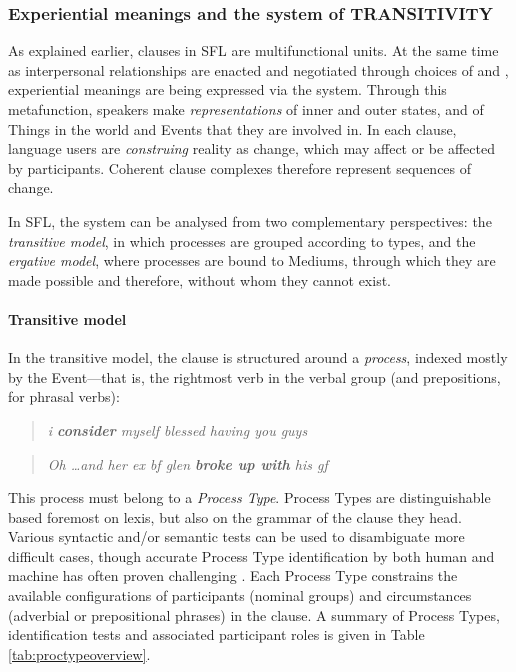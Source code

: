 \subsubsection{Experiential meanings and the system of TRANSITIVITY} \label{sect:trans}

As explained earlier, clauses in \gls{SFL} are multifunctional units. At the same time as interpersonal relationships are enacted and negotiated through choices of  and , experiential meanings are being expressed via the  system. Through this metafunction, speakers make \emph{representations} of inner and outer states, and of Things in the world and Events that they are involved in. In each clause, language users are \emph{construing} reality as change, which may affect or be affected by participants. Coherent clause complexes therefore represent sequences of change.

In \gls{SFL}, the  system can be analysed from two complementary perspectives: the \emph{transitive model}, in which processes are grouped according to types, and the \emph{ergative model}, where processes are bound to Mediums, through which they are made possible and therefore, without whom they cannot exist.

\paragraph{Transitive model}

In the transitive model, the clause is structured around a \emph{process}, indexed mostly by the Event---that is, the rightmost verb in the verbal group (and prepositions, for phrasal verbs):

\begin{multicols}{2}
\begin{quote}
\emph{i \textbf{consider} myself blessed having you guys}  %
\end{quote}
\begin{quote}
\emph{Oh \dots and her ex bf glen \textbf{broke up with} his gf} %
\end{quote}
\end{multicols}
%
\noindent This process must belong to a \emph{Process Type}. Process Types are distinguishable based foremost on lexis, but also on the grammar of the clause they head. Various syntactic and\slash or semantic tests can be used to disambiguate more difficult cases, though accurate Process Type identification by both human and machine has often proven challenging \cite{odonnell_survey_2009}. Each Process Type constrains the available configurations of participants (nominal groups) and circumstances (adverbial or prepositional phrases) in the clause. A summary of Process Types, identification tests and associated participant roles is given in Table \ref{tab:proctypeoverview}.

